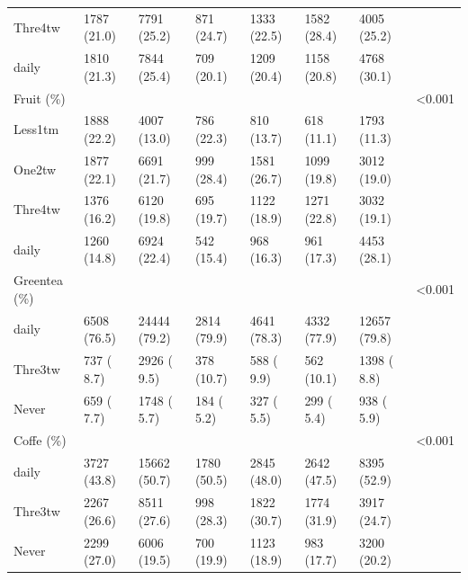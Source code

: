 \documentclass[]{tufte-handout}
\begin{document}
\begin{table}[ht]
\begin{tabular}[t]{llllllll}
\rowcolor{gray!6}  \hspace{1em}Thre4tw & 1787 (21.0) & 7791 (25.2) & 871 (24.7) & 1333 (22.5) & 1582 (28.4) & 4005 (25.2) & \\
\hspace{1em}daily & 1810 (21.3) & 7844 (25.4) & 709 (20.1) & 1209 (20.4) & 1158 (20.8) & 4768 (30.1) & \\
\rowcolor{gray!6}  Fruit (\%) &  &  &  &  &  &  & <0.001\\
\hspace{1em}Less1tm & 1888 (22.2) & 4007 (13.0) & 786 (22.3) & 810 (13.7) & 618 (11.1) & 1793 (11.3) & \\
\rowcolor{gray!6}  \hspace{1em}One2tw & 1877 (22.1) & 6691 (21.7) & 999 (28.4) & 1581 (26.7) & 1099 (19.8) & 3012 (19.0) & \\
\hspace{1em}Thre4tw & 1376 (16.2) & 6120 (19.8) & 695 (19.7) & 1122 (18.9) & 1271 (22.8) & 3032 (19.1) & \\
\rowcolor{gray!6}  \hspace{1em}daily & 1260 (14.8) & 6924 (22.4) & 542 (15.4) & 968 (16.3) & 961 (17.3) & 4453 (28.1) & \\
Greentea (\%) &  &  &  &  &  &  & <0.001\\
\rowcolor{gray!6}  \hspace{1em}daily & 6508 (76.5) & 24444 (79.2) & 2814 (79.9) & 4641 (78.3) & 4332 (77.9) & 12657 (79.8) & \\
\hspace{1em}Thre3tw & 737 ( 8.7) & 2926 ( 9.5) & 378 (10.7) & 588 ( 9.9) & 562 (10.1) & 1398 ( 8.8) & \\
\rowcolor{gray!6}  \hspace{1em}Never & 659 ( 7.7) & 1748 ( 5.7) & 184 ( 5.2) & 327 ( 5.5) & 299 ( 5.4) & 938 ( 5.9) & \\
Coffe (\%) &  &  &  &  &  &  & <0.001\\
\rowcolor{gray!6}  \hspace{1em}daily & 3727 (43.8) & 15662 (50.7) & 1780 (50.5) & 2845 (48.0) & 2642 (47.5) & 8395 (52.9) & \\
\hspace{1em}Thre3tw & 2267 (26.6) & 8511 (27.6) & 998 (28.3) & 1822 (30.7) & 1774 (31.9) & 3917 (24.7) & \\
\rowcolor{gray!6}  \hspace{1em}Never & 2299 (27.0) & 6006 (19.5) & 700 (19.9) & 1123 (18.9) & 983 (17.7) & 3200 (20.2) & \\

\end{tabular}
\end{table}
\end{document}
